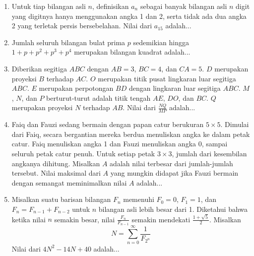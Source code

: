 \documentclass[11pt]{scrartcl}
\begin{document}
\begin{enumerate}[resume]
    \item Untuk tiap bilangan asli $n$, definisikan $a_n$ sebagai banyak bilangan asli $n$ digit yang digitnya hanya menggunakan angka 1 dan 2, serta tidak ada dua angka 2 yang terletak persis bersebelahan. Nilai dari $a_{15}$ adalah...
    \item Jumlah seluruh bilangan bulat prima $p$ sedemikian hingga $1 + p + p^2 + p^3 + p^4$ merupakan bilangan kuadrat adalah...
    \item Diberikan segitiga $ABC$ dengan $AB = 3$, $BC = 4$, dan $CA = 5$. $D$ merupakan proyeksi $B$ terhadap $AC$. $O$ merupakan titik pusat lingkaran luar segitiga $ABC$. $E$ merupakan perpotongan $BD$ dengan lingkaran luar segitiga $ABC$. $M$, $N$, dan $P$ berturut-turut adalah titik tengah $AE$, $DO$, dan $BC$. $Q$ merupakan proyeksi $N$ terhadap $AB$. Nilai dari $\frac{NQ}{MP}$ adalah...
    \item Faiq dan Fauzi sedang bermain dengan papan catur berukuran $5 \times 5$. Dimulai dari Faiq, secara bergantian mereka berdua menuliskan angka ke dalam petak catur. Faiq menuliskan angka 1 dan Fauzi menuliskan angka 0, sampai seluruh petak catur penuh. Untuk setiap petak $3 \times 3$, jumlah dari kesembilan angkanya dihitung. Misalkan $A$ adalah nilai terbesar dari jumlah-jumlah tersebut. Nilai maksimal dari $A$ yang mungkin didapat jika Fauzi bermain dengan semangat meminimalkan nilai $A$ adalah...
    \item Misalkan suatu barisan bilangan $F_n$ memenuhi $F_0 = 0$, $F_1 = 1$, dan $F_n = F_{n-1} + F_{n-2}$ untuk $n$ bilangan asli lebih besar dari 1. Diketahui bahwa ketika nilai $n$ semakin besar, nilai $\frac{F_n}{F_{n-1}}$ semakin mendekati $\frac{1 + \sqrt{5}}{2}$. Misalkan
        $$N = \sum_{n=0}^\infty \frac{1}{F_{2^n}}$$
        Nilai dari $4N^2 - 14N + 40$ adalah...
\end{enumerate}
\end{document}
